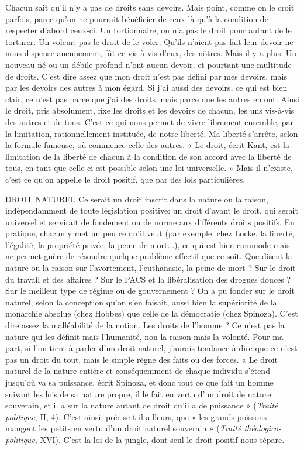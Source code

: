 Chacun sait qu’il n’y a pas de droits sans devoirs. Mais point, comme on le
croit parfois, parce qu’on ne pourrait bénéficier de ceux-là qu’à la condition de
respecter d’abord ceux-ci. Un tortionnaire, on n’a pas le droit pour autant de le
torturer. Un voleur, pas le droit de le voler. Qu'ils n’aient pas fait leur devoir
ne nous dispense aucunement, fût-ce vis-à-vis d’eux, des nôtres. Mais il y a
plus. Un nouveau-né ou un débile profond n’ont aucun devoir, et pourtant
une multitude de droits. C’est dire assez que mon droit n’est pas défini par mes
devoirs, mais par les devoirs des autres à mon égard. Si j’ai aussi des devoirs, ce
qui est bien clair, ce n’est pas parce que j’ai des droits, mais parce que les autres
en ont. Ainsi le droit, pris absolument, fixe les droits et les devoirs de chacun,
les uns vis-à-vis des autres et de tous. C’est ce qui nous permet de vivre librement
ensemble, par la limitation, rationnellement instituée, de notre liberté.
Ma liberté s'arrête, selon la formule fameuse, où commence celle des autres.
« Le droit, écrit Kant, est la limitation de la liberté de chacun à la condition de
son accord avec la liberté de tous, en tant que celle-ci est possible selon une loi
universelle. » Mais il n’existe, c’est ce qu’on appelle le droit positif, que par des
lois particulières.

DROIT NATUREL Ce serait un droit inscrit dans la nature ou la raison,
indépendamment de toute législation positive: un
droit d’avant le droit, qui serait universel et servirait de fondement ou de
norme aux différents droits positifs. En pratique, chacun y met un peu ce qu’il
veut (par exemple, chez Locke, la liberté, l'égalité, la propriété privée, la peine
de mort...), ce qui est bien commode mais ne permet guère de résoudre
quelque problème effectif que ce soit. Que disent la nature ou la raison sur
l'avortement, l'euthanasie, la peine de mort ? Sur le droit du travail et des
affaires ? Sur le PACS et la libéralisation des drogues douces ? Sur le meilleur
type de régime ou de gouvernement ? On a pu fonder sur le droit naturel, selon
la conception qu’on s’en faisait, aussi bien la supériorité de la monarchie
absolue (chez Hobbes) que celle de la démocratie (chez Spinoza). C’est dire
assez la malléabilité de la notion. Les droits de l’homme ? Ce n’est pas la nature
qui les définit mais l’humanité, non la raison mais la volonté. Pour ma part, si
l’on tient à parler d’un droit naturel, j'aurais tendance à dire que ce n’est pas un
droit du tout, mais le simple règne des faits ou des forces. « Le droit naturel de
la nature entière et conséquemment de chaque individu s’étend jusqu'où va sa
puissance, écrit Spinoza, et donc tout ce que fait un homme suivant les lois de
sa nature propre, il le fait en vertu d’un droit de nature souverain, et il a sur la
nature autant de droit qu’il a de puissance » ({\it Traité politique}, II, 4). C’est ainsi,
précise-t-il ailleurs, que « les grands poissons mangent les petits en vertu d’un
droit naturel souverain » ({\it Traité théologico-politique}, XVI). C’est la loi de la
jungle, dont seul le droit positif nous sépare.

